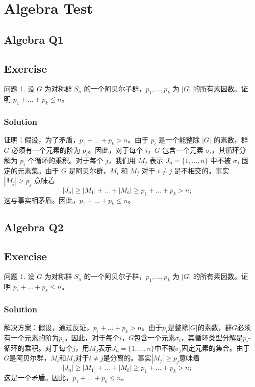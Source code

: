 \documentclass[12pt]{book}
\begin{document}
\tableofcontents
\newpage
\chapter{Algebra Test}
\section{Algebra Q1}
\section*{Exercise}
问题 1. 设 $G$ 为对称群 $S_n$ 的一个阿贝尔子群，$p_1, \dots, p_k$ 为 $|G|$ 的所有素因数。证明 $p_1 + \dots + p_k \le n$。



\subsection*{Solution}
证明：假设，为了矛盾，$p_1 + \dots + p_k > n$。由于 $p_i$ 是一个能整除 $|G|$ 的素数，群 $G$ 必须有一个元素的阶为 $p_i$。因此，对于每个 $i$，$G$ 包含一个元素 $\sigma_i$，其循环分解为 $p_i$ 个循环的乘积。对于每个 $j$，我们用 $M_j$ 表示 $J_n = \{1, \dots, n\}$ 中不被 $\sigma_j$ 固定的元素集。由于 $G$ 是阿贝尔群，$M_i$ 和 $M_j$ 对于 $i \ne j$ 是不相交的。事实 $|M_j| \ge p_j$ 意味着
\[|J_n| \ge |M_1| + \dots + |M_k| \ge p_1 + \dots + p_k > n;\]
这与事实相矛盾。因此，$p_1 + \dots + p_k \le n$。
\newpage
\section{Algebra Q2}
\section*{Exercise}
问题 1. 设 $G$ 为对称群 $S_n$ 的一个阿贝尔子群，$p_1, \dots, p_k$ 为 $|G|$ 的所有素因数。证明 $p_1 + \dots + p_k \le n$。



\subsection*{Solution}
解决方案：假设，通过反证，$p_1 + \dots + p_k > n$。由于$p_i$是整除$|G|$的素数，群$G$必须有一个元素的阶为$p_i$。因此，对于每个$i$，$G$包含一个元素$\sigma_i$，其循环类型分解是$p_i$-循环的乘积。对于每个$j$，用$M_j$表示$J_n = \{1, \dots, n\}$中不被$\sigma_j$固定元素的集合。由于$G$是阿贝尔群，$M_i$和$M_j$对于$i \ne j$是分离的。事实$|M_j| \ge p_j$意味着
\[ |J_n| \ge |M_1| + \dots + |M_k| \ge p_1 + \dots + p_k > n; \]
这是一个矛盾。因此，$p_1 + \dots + p_k \le n$。
\newpage
\end{document}
